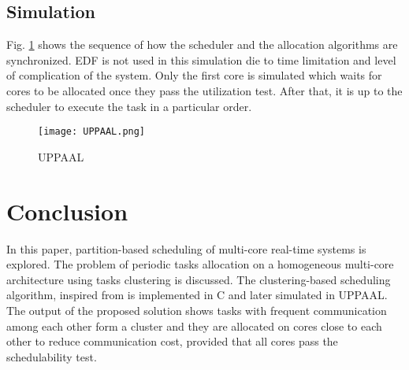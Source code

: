 \documentclass[conference]{IEEEtran}
\begin{document}
\subsection{Simulation}
\label{subsec: simulation}
Fig. \ref{fig:UPPAAL} shows the sequence of how the scheduler and the allocation algorithms are synchronized. EDF is not used in this simulation die to time limitation and level of complication of the system. Only the first core is simulated which waits for cores to be allocated once they pass the utilization test. After that, it is up to the scheduler to execute the task in a particular order. 
\begin{figure}[h!]
    \centering
    \texttt{[image: UPPAAL.png]}
    \caption{UPPAAL}
    \label{fig:UPPAAL}
\end{figure}

\section{Conclusion}
\label{subsec: conclusion}
In this paper, partition-based scheduling of multi-core real-time systems is explored.  The problem of periodic tasks allocation on a homogeneous multi-core architecture using tasks clustering is discussed. The clustering-based scheduling algorithm, inspired from \cite{AbdallahGB24} is implemented in C and later simulated in UPPAAL. The output of the proposed solution shows tasks with frequent communication among each other form a cluster and they are allocated on cores close to each other to reduce communication cost, provided that all cores pass the schedulability test. 

\printbibliography
\end{document}
